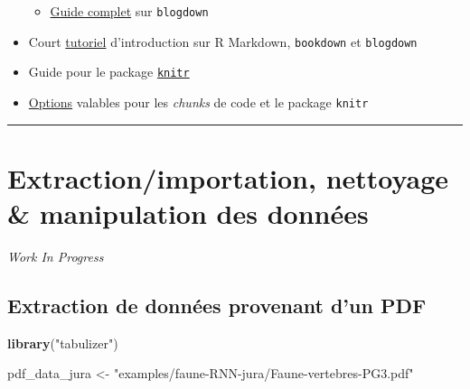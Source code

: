 \documentclass[
  french,
]{book}
\newenvironment{Shaded}{\begin{snugshade}}{\end{snugshade}}
\newcommand{\KeywordTok}[1]{\textcolor[rgb]{0.13,0.29,0.53}{\textbf{#1}}}
\newcommand{\NormalTok}[1]{#1}
\newcommand{\StringTok}[1]{\textcolor[rgb]{0.31,0.60,0.02}{#1}}
\providecommand{\tightlist}{%
  \setlength{\itemsep}{0pt}\setlength{\parskip}{0pt}}
\newenvironment{infobox}[1]
  {
  \begin{itemize}
  \renewcommand{\labelitemi}{
    \raisebox{-.7\height}[0pt][0pt]{
      {\setkeys{Gin}{width=3em,keepaspectratio}
        \texttt{[image: images/\#1]}}
    }
  }
  \setlength{\fboxsep}{1em}
  \begin{blackbox}
  \item
  }
  {
  \end{blackbox}
  \end{itemize}
  }
\begin{document}
\begin{itemize}
  \begin{itemize}
  \tightlist
  \item
    \href{https://bookdown.org/yihui/blogdown/}{Guide complet} sur \texttt{blogdown}
  \end{itemize}
\item
  Court \href{https://slides.yihui.org/2017-rmarkdown-UNL-Yihui-Xie.html\#1}{tutoriel}
  d'introduction sur R Markdown, \texttt{bookdown} et \texttt{blogdown}
\item
  Guide pour le package \href{https://yihui.org/knitr/}{\texttt{knitr}}
\item
  \href{https://yihui.org/knitr/options/}{Options} valables pour les \emph{chunks} de code
  et le package \texttt{knitr}
\end{itemize}

\begin{center}\rule{0.5\linewidth}{0.5pt}\end{center}

\hypertarget{data-analysis}{%
\chapter{Extraction/importation, nettoyage \& manipulation des données}\label{data-analysis}}

\begin{infobox}{caution}

\emph{\emph{Work In Progress}}

\end{infobox}

\hypertarget{extraction-de-donnuxe9es-provenant-dun-pdf}{%
\section{Extraction de données provenant d'un PDF}\label{extraction-de-donnuxe9es-provenant-dun-pdf}}

\begin{Shaded}
\begin{Highlighting}[]
\KeywordTok{library}\NormalTok{(}\StringTok{"tabulizer"}\NormalTok{)}
\end{Highlighting}
\end{Shaded}

\begin{Shaded}
\begin{Highlighting}[]
\NormalTok{pdf\_data\_jura \textless{}{-}}\StringTok{ "examples/faune{-}RNN{-}jura/Faune{-}vertebres{-}PG3.pdf"}
\end{Highlighting}
\end{Shaded}
\end{document}
